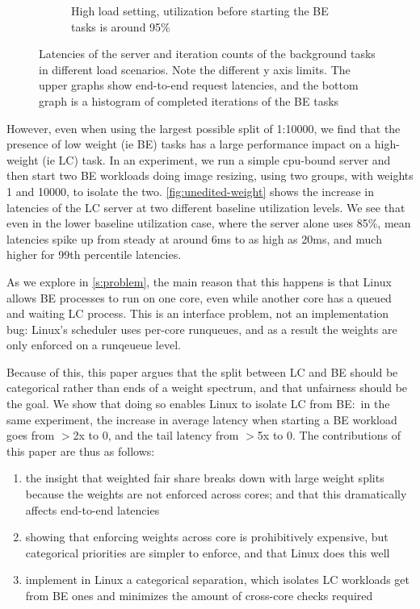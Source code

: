 \begin{figure}[t]
\begin{subfigure}[b]{0.49\columnwidth}
        \caption{High load setting, utilization before starting the BE tasks is
        around 95\%}\label{fig:unedited-weight-high-two}
    \end{subfigure}
    \vspace{4pt}
    \caption{Latencies of the server and iteration counts of the background
    tasks in different load scenarios. Note the different y axis limits. The
    upper graphs show end-to-end request latencies, and the bottom graph is a
    histogram of completed iterations of the BE tasks}\label{fig:unedited-weight}
\end{figure}

However, even when using the largest possible split of 1:10000, we find that the
presence of low weight (ie BE) tasks has a large performance impact on a
high-weight (ie LC) task. In an experiment, we run a simple cpu-bound server and
then start two BE workloads doing image resizing, using two \cgroups{} groups,
with weights 1 and 10000, to isolate the two. \autoref{fig:unedited-weight}
shows the increase in latencies of the LC server at two different baseline
utilization levels. We see that even in the lower baseline utilization case,
where the server alone uses 85\%, mean latencies spike up from steady at around
6ms to as high as 20ms, and much higher for 99th percentile latencies.

As we explore in \autoref{s:problem}, the main reason that this happens is that
Linux allows BE processes to run on one core, even while another core has a
queued and waiting LC process. This is an interface problem, not an
implementation bug: Linux's scheduler uses per-core runqueues, and as a result
the weights are only enforced on a runqeueue level.

Because of this, this paper argues that the split between LC and BE should be
categorical rather than ends of a weight spectrum, and that unfairness should be
the goal. We show that doing so enables Linux to isolate LC from BE:\ in the
same experiment, the increase in average latency when starting a BE workload
goes from $>$2x to 0, and the tail latency from $>$5x to 0. The contributions of
this paper are thus as follows: 
\begin{enumerate}
    \item the insight that weighted fair share breaks down with large weight
    splits because the weights are not enforced across cores; and that this
    dramatically affects end-to-end latencies
    \item showing that enforcing weights across core is prohibitively expensive,
    but categorical priorities are simpler to enforce, and that Linux does this
    well
    \item implement in Linux a categorical separation, which isolates LC
    workloads get from BE ones and minimizes the amount of cross-core checks
    required
\end{enumerate}
